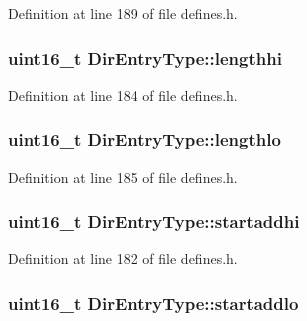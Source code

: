 Definition at line 189 of file defines.\-h.

\hypertarget{structDirEntryType_ad7aaba7b01038bc8bacb096bd66fff08}{
\subsubsection[{lengthhi}]{\setlength{\rightskip}{0pt plus 5cm}uint16\-\_\-t Dir\-Entry\-Type\-::lengthhi}}\label{structDirEntryType_ad7aaba7b01038bc8bacb096bd66fff08}


Definition at line 184 of file defines.\-h.

\hypertarget{structDirEntryType_ad1cde25a0229866557cd5983c27fbd31}{
\subsubsection[{lengthlo}]{\setlength{\rightskip}{0pt plus 5cm}uint16\-\_\-t Dir\-Entry\-Type\-::lengthlo}}\label{structDirEntryType_ad1cde25a0229866557cd5983c27fbd31}


Definition at line 185 of file defines.\-h.

\hypertarget{structDirEntryType_a0cab2915e9f864e25b24d298c36c11db}{
\subsubsection[{startaddhi}]{\setlength{\rightskip}{0pt plus 5cm}uint16\-\_\-t Dir\-Entry\-Type\-::startaddhi}}\label{structDirEntryType_a0cab2915e9f864e25b24d298c36c11db}


Definition at line 182 of file defines.\-h.

\hypertarget{structDirEntryType_aea0e798bb172b4bddf174ce339a4a54a}{
\subsubsection[{startaddlo}]{\setlength{\rightskip}{0pt plus 5cm}uint16\-\_\-t Dir\-Entry\-Type\-::startaddlo}}\label{structDirEntryType_aea0e798bb172b4bddf174ce339a4a54a}


